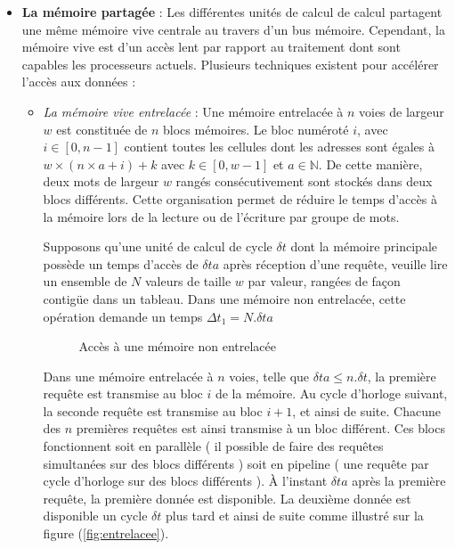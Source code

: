 \documentclass[fleqn,11pt]{article}
\begin{document}
\begin{itemize}
\item \textbf{La mémoire partagée} : Les différentes unités de calcul de calcul partagent une même mémoire vive centrale au travers d'un bus mémoire. Cependant, la mémoire vive est d'un accès lent par rapport au traitement dont sont capables les processeurs actuels. Plusieurs techniques existent pour accélérer l'accès aux données :
  \begin{itemize}
  \item \textsl{La mémoire vive entrelacée} : Une mémoire entrelacée à $n$ voies de largeur $w$ est constituée de $n$ blocs mémoires. Le bloc numéroté $i$, avec $i\in \left[0, n-1\right]$ contient toutes les cellules dont les adresses sont égales à $w\times ( n \times a + i ) +  k $ avec $k\in \left[0,w-1\right]$ et $a\in \mathds{N}$. De cette manière, deux mots de largeur $w$ rangés consécutivement sont stockés dans deux blocs différents. Cette organisation permet de réduire  le temps d'accès à la mémoire lors de la lecture ou de l'écriture par groupe de mots.

Supposons qu'une unité de calcul de cycle $\delta t$ dont la mémoire principale possède un temps d'accès de $\delta ta$  après réception d'une requête, veuille lire un ensemble de $N$ valeurs de taille $w$ par valeur, rangées de façon contigüe dans un tableau. Dans une mémoire non entrelacée, cette opération demande un temps $\Delta t_{1} = N.\delta ta$

\begin{figure}[h]
\begin{center}
\end{center}
\caption{Accès à une mémoire non entrelacée}
\end{figure}

Dans une mémoire entrelacée à $n$ voies, telle que $\delta ta \leq n.\delta t$, la première requête est transmise au bloc $i$ de la mémoire. Au cycle d'horloge suivant, la seconde requête est transmise au bloc $i+1$, et ainsi de suite. Chacune des $n$ premières requêtes est ainsi transmise à un bloc différent. Ces blocs fonctionnent soit en parallèle  ( il possible de faire des requêtes simultanées sur des blocs différents )  soit en pipeline ( une requête par cycle d'horloge sur des blocs différents ). À l'instant $\delta ta$ après la première requête, la première donnée est disponible. La deuxième donnée est disponible un cycle $\delta t$ plus tard et ainsi de suite comme illustré sur la figure (\ref{fig:entrelacee}).


\end{itemize}
\end{itemize}
\end{document}
